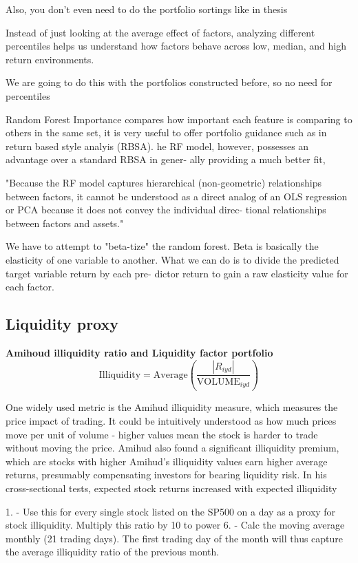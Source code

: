 Also, you don't even need to do the portfolio sortings like in thesis

Instead of just looking at the average effect of factors, analyzing different percentiles helps us understand how factors behave across low, median, and high return environments.

We are going to do this with the portfolios constructed before, so no need for percentiles


Random Forest Importance compares how important each feature is comparing to others in the same set, it is very useful to offer portfolio guidance such as in  return based style analyis (RBSA). he RF model, however,
possesses an advantage over a standard RBSA in gener-
ally providing a much better fit,

"Because the RF model captures hierarchical
(non-geometric) relationships between factors, it cannot
be understood as a direct analog of an OLS regression
or PCA because it does not convey the individual direc-
tional relationships between factors and assets."

We have to attempt to "beta-tize" the random forest. Beta is basically the elasticity of one variable to another. What we can do is to divide the predicted target variable return by each pre-
dictor return to gain a raw elasticity value for each factor.

\subsection{Liquidity proxy}

\textbf{Amihoud illiquidity ratio and Liquidity factor portfolio}
$$\text{Illiquidity} = \text{Average} \left( \frac{|R_{iyd}|}{\text{VOLUME}_{iyd}} \right)
$$

One widely used metric is the Amihud illiquidity measure, which measures the price impact of trading. It could be intuitively understood as how much prices move per unit of volume - higher values mean the stock is harder to trade without moving the price. Amihud also found a significant illiquidity premium, which are stocks with higher Amihud's illiquidity values earn higher average returns, presumably compensating investors for bearing liquidity risk. In his cross-sectional tests, expected stock returns increased with expected illiquidity \cite{amihud_2002}


1.
- Use this for every single stock listed on the SP500 on a day as a proxy for stock illiquidity. Multiply this ratio by 10 to power 6. 
- Calc the moving average monthly (21 trading days). The first trading day of the month will thus capture the average illiquidity ratio of the previous month.

